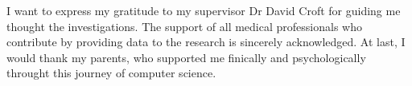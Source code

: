 I want to express my gratitude to my supervisor Dr David Croft for guiding me thought the investigations. The support of all medical professionals who contribute by providing data to the research is sincerely acknowledged. At last, I would thank my parents, who supported me finically and psychologically throught this journey of computer science.